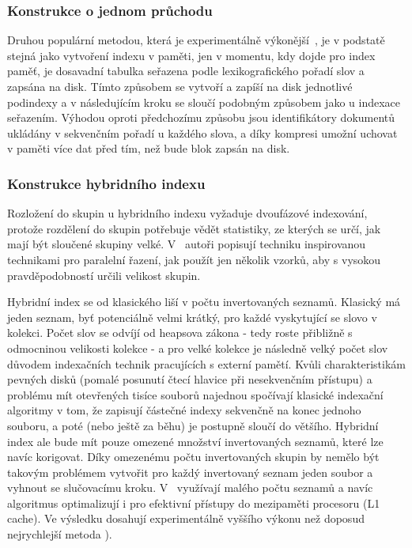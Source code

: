 \documentclass[11pt,letterpaper,oneside,openright]{book}
\begin{document}
\subsubsection{Konstrukce o jednom průchodu}
Druhou populární metodou, která je experimentálně
výkonější~\cite{Heinz:2003:ESI:873988.873992}, je v podstatě stejná jako
vytvoření indexu v paměti, jen v momentu, kdy dojde pro index paměť, je
dosavadní tabulka seřazena podle lexikografického pořadí slov a zapsána na
disk. Tímto způsobem se vytvoří a zapíší na disk jednotlivé podindexy a v
následujícím kroku se sloučí podobným způsobem jako u indexace seřazením.
Výhodou oproti předchozímu způsobu jsou identifikátory dokumentů ukládány v
sekvenčním pořadí u každého slova, a díky kompresi umožní uchovat v paměti více
dat před tím, než bude blok zapsán na disk.

\subsubsection{Konstrukce hybridního indexu}
Rozložení do skupin u hybridního indexu vyžaduje dvoufázové indexování, protože
rozdělení do skupin potřebuje vědět statistiky, ze kterých se určí, jak mají
být sloučené skupiny velké. V~\cite{Bast:2011:FCH:1993036.1993040} autoři
popisují techniku inspirovanou technikami pro paralelní řazení, jak použít jen
několik vzorků, aby s vysokou pravděpodobností určili velikost skupin.

Hybridní index se od klasického liší v počtu invertovaných seznamů. Klasický má
jeden seznam, byť potenciálně velmi krátký, pro každé vyskytující se slovo v
kolekci. Počet slov se odvíjí od heapsova zákona - tedy roste přibližně s
odmocninou velikosti kolekce - a pro velké kolekce je následně velký počet slov
důvodem indexačních technik pracujících s externí pamětí. Kvůli
charakteristikám pevných disků (pomalé posunutí čtecí hlavice při nesekvenčním
přístupu) a problému mít otevřených tisíce souborů najednou spočívají klasické
indexační algoritmy v tom, že zapisují částečné indexy sekvenčně na konec
jednoho souboru, a poté (nebo ještě za běhu) je postupně sloučí do většího.
Hybridní index ale bude mít pouze omezené množství invertovaných seznamů, které
lze navíc korigovat. Díky omezenému počtu invertovaných skupin by nemělo být
takovým problémem vytvořit pro každý invertovaný seznam jeden soubor a vyhnout
se slučovacímu kroku. V~\cite{Bast:2011:FCH:1993036.1993040} využívají malého
počtu seznamů a navíc algoritmus optimalizují i pro efektivní přístupy do
mezipaměti procesoru (L1 cache). Ve výsledku dosahují experimentálně vyššího
výkonu než doposud nejrychlejší metoda ).
\end{document}
